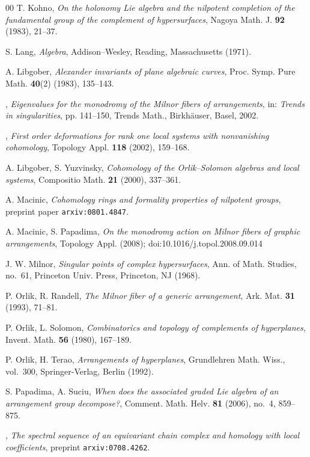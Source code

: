 \documentclass[psamsfonts]{conm-p-l}
\theoremstyle{definition}
\theoremstyle{remark}
\numberwithin{equation}{section}
\begin{document}
\begin{thebibliography}{00}
 T. Kohno,
\textit{ On the holonomy {L}ie algebra and the nilpotent completion
of the fundamental group of the complement of hypersurfaces},
Nagoya Math. J. \textbf{92} (1983), 21--37.  

 S. Lang,
\textit{ Algebra},
Addison--Wesley, Reading, Massachusetts (1971).

 A. Libgober,
\textit{ Alexander invariants of plane algebraic curves},
Proc. Symp. Pure Math. \textbf{40}(2) (1983), 135--143.

 \bysame,
\textit{ Eigenvalues for the monodromy of the Milnor fibers of arrangements},
in: {\em Trends in singularities}, pp. 141--150, 
Trends Math., Birkh\" auser, Basel, 2002.

 \bysame,
\textit{ First order deformations for rank one local systems with nonvanishing cohomology},
Topology  Appl. \textbf{118} (2002), 159--168.

 A. Libgober, S. Yuzvinsky,
{\em Cohomology of the Orlik--Solomon algebras and local systems},
Compositio Math. \textbf{21} (2000), 337--361.

 A. Macinic,
\textit{ Cohomology rings and formality properties of nilpotent groups},
preprint paper {\tt arxiv:0801.4847}.


 A. Macinic, S. Papadima,
\textit{ On the monodromy action on Milnor fibers of graphic arrangements},
Topology Appl. (2008); doi:10.1016/j.topol.2008.09.014


 J. W. Milnor, 
\textit{ Singular points of complex hypersurfaces}, Ann. of Math. 
Studies, no.~61, Princeton Univ. Press, Princeton, NJ (1968). 

 P. Orlik, R. Randell,
\textit{ The Milnor fiber of a generic arrangement},
Ark. Mat. \textbf{31} (1993), 71--81.

 P. Orlik, L. Solomon,
\textit{ Combinatorics and topology of complements of
hyperplanes}, Invent. Math. \textbf{56} (1980), 167--189.

 P. Orlik, H. Terao,
\textit{ Arrangements of hyperplanes}, Grundlehren Math. Wiss., vol.~300,
Springer-Verlag, Berlin (1992).

 S. Papadima, A. Suciu,
\textit{ When does the associated graded Lie algebra of an 
arrangement group decompose?}, Comment. Math. Helv. 
\textbf{81} (2006), no.~4, 859--875.

 \bysame,
\textit{ The spectral sequence of an equivariant chain complex 
and homology with local coefficients},
preprint {\tt arxiv:0708.4262}.


\end{thebibliography}
\end{document}
